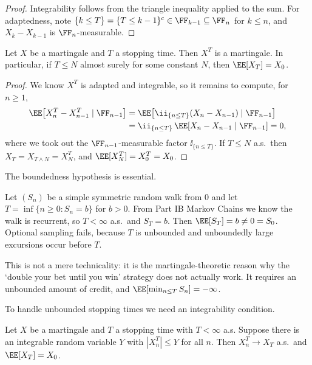 \begin{proof}
	Integrability follows from the triangle inequality applied to the sum. For adaptedness, note $\{k \leq T\} = \{T \leq k-1\}^c \in\FF_{k-1}\subseteq\FF_n$ for $k \leq n$, and $X_k - X_{k-1}$ is $\FF_n$-measurable.
\end{proof}

\begin{theorem}\label{thm:optional-sampling}
	Let $X$ be a martingale and $T$ a stopping time. Then $X^T$ is a martingale. In particular, if $T \leq N$ almost surely for some constant $N$, then $\EE[X_T] = X_0$.
\end{theorem}

\begin{proof}
	We know $X^T$ is adapted and integrable, so it remains to compute, for $n\geq1$,
	\begin{align*}
		\EE\big[X_n^T - X_{n-1}^T \mid\FF_{n-1}\big] &= \EE\big[\ii_{\{n\leq T\}}(X_n - X_{n-1})\mid\FF_{n-1}\big]\\
		&= \ii_{\{n\leq T\}}\,\EE[X_n - X_{n-1}\mid\FF_{n-1}] = 0,
	\end{align*}
	where we took out the $\FF_{n-1}$-measurable factor $\ii_{\{n\leq T\}}$. If $T \leq N$ a.s.\ then $X_T = X_{T\wedge N} = X_N^T$, and $\EE[X^T_N] = X^T_0 = X_0$.
\end{proof}

The boundedness hypothesis is essential.

\begin{example}\label{ex:doubling}
	Let $(S_n)$ be a simple symmetric random walk from $0$ and let $T = \inf\{n\geq0 : S_n = b\}$ for $b > 0$. From Part IB Markov Chains we know the walk is recurrent, so $T < \infty$ a.s.\ and $S_T = b$. Then $\EE[S_T] = b \neq 0 = S_0$. Optional sampling fails, because $T$ is unbounded and unboundedly large excursions occur before $T$.

	This is not a mere technicality: it is the martingale-theoretic reason why the `double your bet until you win' strategy does not actually work. It requires an unbounded amount of credit, and $\EE[\min_{n \leq T}S_n] = -\infty$.
\end{example}

To handle unbounded stopping times we need an integrability condition.

\begin{theorem}\label{thm:optional-stopping}
	Let $X$ be a martingale and $T$ a stopping time with $T<\infty$ a.s. Suppose there is an integrable random variable $Y$ with $|X^T_n| \leq Y$ for all $n$. Then $X_n^T \to X_T$ a.s.\ and $\EE[X_T] = X_0$.
\end{theorem}

